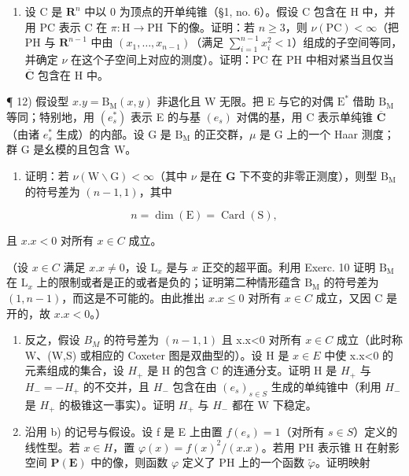 \begin{enumerate}
\def\labelenumi{\alph{enumi})}
\setcounter{enumi}{2}
\tightlist
\item
  设 C 是 \(\mathbf{R}^n\) 中以 0 为顶点的开单纯锥（§1, no. 6）。假设 C 包含在 H 中，并用 PC 表示 C 在 \(\pi: \mathrm{H} \to \mathrm{PH}\) 下的像。证明：若 \(n \geqslant 3\)，则 \(\nu(\mathrm{PC}) < \infty\)（把 PH 与 \(\mathbf{R}^{n-1}\) 中由 \((x_1, \ldots, x_{n-1})\)（满足 \(\sum_{i=1}^{n-1} x_i^2 < 1\)）组成的子空间等同，并确定 \(\nu\) 在这个子空间上对应的测度）。证明：PC 在 PH 中相对紧当且仅当 \(\overline{\mathbf{C}}\) 包含在 H 中。
\end{enumerate}

¶ 12) 假设型 \(x.y = \mathrm{B}_{\mathrm{M}}(x,y)\) 非退化且 W 无限。把 E 与它的对偶 \(\mathrm{E}^*\) 借助 \(\mathrm{B}_{\mathrm{M}}\) 等同；特别地，用 \((e_s^*)\) 表示 E 的与基 \((e_s)\) 对偶的基，用 C 表示单纯锥 \(\overline{\mathbf{C}}\)（由诸 \(e_s^*\) 生成）的内部。设 G 是 \(\mathrm{B}_{\mathrm{M}}\) 的正交群，\(\mu\) 是 G 上的一个 Haar 测度；群 G 是幺模的且包含 W。

\begin{enumerate}
\def\labelenumi{\alph{enumi})}
\tightlist
\item
  证明：若 \(\nu (\mathrm{W}\backslash \mathrm{G}) < \infty\)（其中 \(\nu\) 是在 \(\mathbf{G}\) 下不变的非零正测度），则型 \(\mathrm{B_M}\) 的符号差为 \((n - 1,1)\)，其中
\end{enumerate}

\[
n = \dim (\mathrm{E}) = \operatorname{Card} (\mathrm{S}),
\]

且 \(x.x < 0\) 对所有 \(x \in C\) 成立。

（设 \(x \in C\) 满足 \(x.x \neq 0\)，设 \(\mathrm{L}_x\) 是与 \(x\) 正交的超平面。利用 Exerc. 10 证明 \(\mathrm{B}_{\mathrm{M}}\) 在 \(\mathrm{L}_x\) 上的限制或者是正的或者是负的；证明第二种情形蕴含 \(\mathrm{B}_{\mathrm{M}}\) 的符号差为 \((1, n - 1)\)，而这是不可能的。由此推出 \(x.x \leqslant 0\) 对所有 \(x \in C\) 成立，又因 C 是开的，故 \(x.x < 0\)。）

\begin{enumerate}
\def\labelenumi{\alph{enumi})}
\setcounter{enumi}{1}
\item
  反之，假设 \(B_{M}\) 的符号差为 \((n-1,1)\) 且 x.x\textless0 对所有 \(x\in C\) 成立（此时称 W、(W,S) 或相应的 Coxeter 图是双曲型的）。设 H 是 \(x\in E\) 中使 x.x\textless0 的元素组成的集合，设 \(H_{+}\) 是 H 的包含 C 的连通分支。证明 H 是 \(H_{+}\) 与 \(H_{-}=-H_{+}\) 的不交并，且 \(H_{-}\) 包含在由 \((e_{s})_{s\in S}\) 生成的单纯锥中（利用 \(H_{-}\) 是 \(H_{+}\) 的极锥这一事实）。证明 \(H_{+}\) 与 \(H_{-}\) 都在 W 下稳定。
\item
  沿用 b) 的记号与假设。设 f 是 E 上由置 \(f(e_{s}) = 1\)（对所有 \(s \in S\)）定义的线性型。若 \(x \in H\)，置 \(\varphi(x) = f(x)^{2}/(x.x)\)。若用 PH 表示锥 H 在射影空间 \(\mathbf{P}(\mathbf{E})\) 中的像，则函数 \(\varphi\) 定义了 PH 上的一个函数 \(\tilde{\varphi}\)。证明映射
\end{enumerate}

